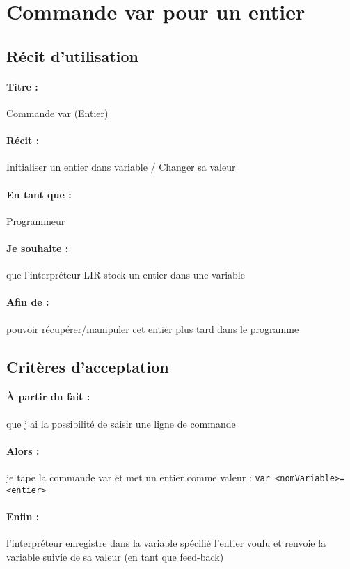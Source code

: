     \section{Commande var pour un entier}
   \subsection*{Récit d'utilisation}

    \paragraph{Titre : } Commande var (Entier)
    \paragraph{Récit : }  Initialiser un entier dans variable / Changer sa valeur
    \paragraph{En tant que : } Programmeur
    \paragraph{Je souhaite : } que l'interpréteur LIR stock un entier dans une variable
    \paragraph{Afin de : } pouvoir récupérer/manipuler cet entier plus tard dans le programme

    \subsection*{Critères d'acceptation}

    \paragraph{À partir du fait : } que j'ai la possibilité de saisir une ligne de commande
    \paragraph{Alors : } je tape la commande var et met un entier comme valeur :
    \verb |var <nomVariable>=<entier> |
    \paragraph{Enfin : } l'interpréteur enregistre dans la variable spécifié l'entier voulu et renvoie la variable suivie de sa valeur (en tant que feed-back)
